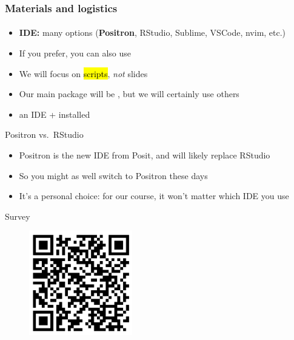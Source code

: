 \documentclass[xcolor=dvipsnames, handout, onlymath, 10pt, aspectratio=169]{beamer}
\begin{document}



\begin{frame}
	\frametitle{Materials and logistics}
	\framesubtitle{}

	\begin{itemize}
		\item[\winner] \textbf{IDE:} many options (\textbf{Positron}, RStudio, Sublime, VSCode, nvim, etc.)
		\item If you prefer, you can also use 
		\item We will focus on \hl{scripts}, \textit{not} slides
		\item Our main package will be , but we will certainly use others 
		\item[]  an IDE +  installed
	\end{itemize}


	\begin{importanttitle}{Positron vs.\ RStudio}
		\begin{itemize}
			\item Positron is the new IDE from Posit, and will likely replace RStudio
			\item So you might as well switch to Positron these days
			\item [\winner] It's a personal choice: for our course, it won't matter which IDE you use
		\end{itemize}
	\end{importanttitle}


\end{frame}


\begin{frame}{Survey}{}

	\begin{figure}
		\begin{center}
			\includegraphics[width=0.4\textwidth]{qr.png}
		\end{center}
	\end{figure}

\end{frame}
\end{document}
